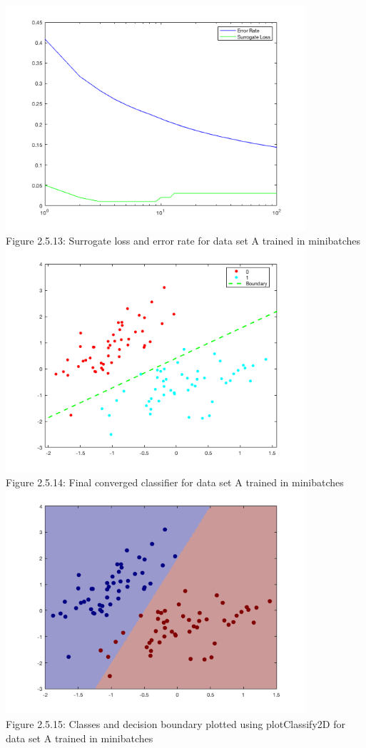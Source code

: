 \documentclass[]{scrreprt}   %
\begin{document}
\begin{center}
	\includegraphics[width=30em,keepaspectratio]{p5figure13.png}\\
	{Figure 2.5.13: Surrogate loss and error rate for data set A trained in minibatches}
	\includegraphics[width=30em,keepaspectratio]{p5figure14.png}\\
	{Figure 2.5.14: Final converged classifier for data set A trained in minibatches}
	\includegraphics[width=30em,keepaspectratio]{p5figure15.png}\\
	{Figure 2.5.15: Classes and decision boundary plotted using plotClassify2D for data set A trained in minibatches}
	

\end{center}
\end{document}
